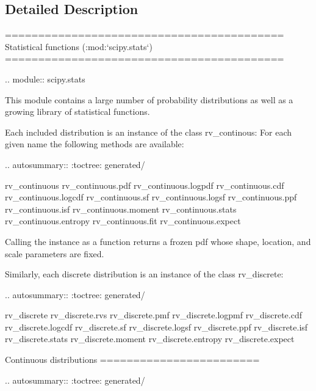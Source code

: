 \subsection{Detailed Description}
\begin{DoxyVerb}==========================================
Statistical functions (:mod:`scipy.stats`)
==========================================

.. module:: scipy.stats

This module contains a large number of probability distributions as
well as a growing library of statistical functions.

Each included distribution is an instance of the class rv_continous:
For each given name the following methods are available:

.. autosummary::
   :toctree: generated/

   rv_continuous
   rv_continuous.pdf
   rv_continuous.logpdf
   rv_continuous.cdf
   rv_continuous.logcdf
   rv_continuous.sf
   rv_continuous.logsf
   rv_continuous.ppf
   rv_continuous.isf
   rv_continuous.moment
   rv_continuous.stats
   rv_continuous.entropy
   rv_continuous.fit
   rv_continuous.expect

Calling the instance as a function returns a frozen pdf whose shape,
location, and scale parameters are fixed.

Similarly, each discrete distribution is an instance of the class
rv_discrete:

.. autosummary::
   :toctree: generated/

   rv_discrete
   rv_discrete.rvs
   rv_discrete.pmf
   rv_discrete.logpmf
   rv_discrete.cdf
   rv_discrete.logcdf
   rv_discrete.sf
   rv_discrete.logsf
   rv_discrete.ppf
   rv_discrete.isf
   rv_discrete.stats
   rv_discrete.moment
   rv_discrete.entropy
   rv_discrete.expect

Continuous distributions
========================

.. autosummary::
   :toctree: generated/


\end{DoxyVerb}
